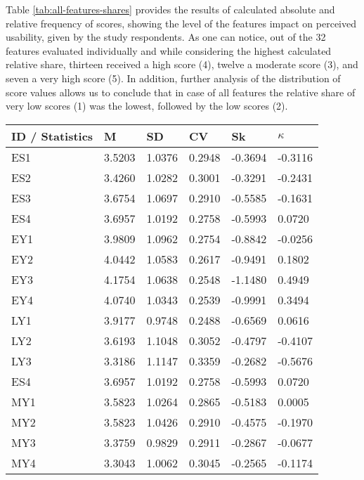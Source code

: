 \documentclass[preprint,12pt]{elsarticle}
\begin{document}
Table \ref{tab:all-features-shares} provides the results of calculated absolute and relative frequency of scores, showing the level of the features impact on perceived usability, given by the study respondents. 
As one can notice, out of the 32 features evaluated individually and while considering the highest calculated relative share, thirteen received a high score (4), twelve a moderate score (3), and seven a very high score (5). In addition, further analysis of the distribution of score values allows us to conclude that in case of all features the relative share of very low scores (1) was the lowest, followed by the low scores (2).  

\begin{table}[]
\begin{tabular}{|l|l|l|l|l|l|}
\hline
\textbf{ID} / \textbf{Statistics}  & \textbf{M} & \textbf{SD}  & \textbf{CV} & \textbf{Sk} & \textbf{$\kappa$}     \\ \hline
ES1 & 3.5203  & 1.0376 & 0.2948 & -0.3694 & -0.3116  \\ \hline
ES2 & 3.4260  & 1.0282 & 0.3001 & -0.3291 & -0.2431  \\ \hline
ES3 & 3.6754  & 1.0697 & 0.2910 & -0.5585 & -0.1631  \\ \hline
ES4 & 3.6957  & 1.0192 & 0.2758 & -0.5993 & 0.0720   \\ \hline
EY1 & 3.9809  & 1.0962 & 0.2754 & -0.8842 & -0.0256  \\ \hline
EY2 & 4.0442  & 1.0583 & 0.2617 & -0.9491 & 0.1802   \\ \hline
EY3 & 4.1754  & 1.0638 & 0.2548 & -1.1480 & 0.4949   \\ \hline
EY4 & 4.0740  & 1.0343 & 0.2539 & -0.9991 & 0.3494   \\ \hline
LY1 & 3.9177  & 0.9748 & 0.2488 & -0.6569 & 0.0616   \\ \hline
LY2 & 3.6193  & 1.1048 & 0.3052 & -0.4797 & -0.4107  \\ \hline
LY3 & 3.3186  & 1.1147 & 0.3359 & -0.2682 & -0.5676  \\ \hline
ES4 & 3.6957  & 1.0192 & 0.2758 & -0.5993 & 0.0720   \\ \hline
MY1 & 3.5823  & 1.0264 & 0.2865 & -0.5183 & 0.0005   \\ \hline
MY2 & 3.5823  & 1.0426 & 0.2910 & -0.4575 & -0.1970  \\ \hline
MY3 & 3.3759  & 0.9829 & 0.2911 & -0.2867 & -0.0677  \\ \hline
MY4 & 3.3043  & 1.0062 & 0.3045 & -0.2565 & -0.1174  \\ \hline

\end{tabular}
\end{table}
\end{document}
